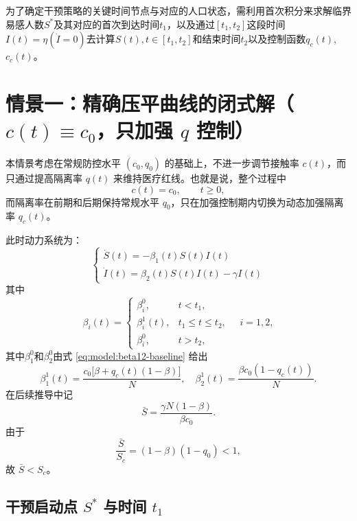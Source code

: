 \documentclass[lang=cn,a4paper,newtx]{elegantpaper}
\numberwithin{equation}{section}
\theoremstyle{plain}
\begin{document}
为了确定干预策略的关键时间节点与对应的人口状态，需利用首次积分来求解临界易感人数$S^*$及其对应的首次到达时间$t_1$，以及通过$[t_1,t_2]$这段时间$I(t) = \eta(\dot{I}=0)$去计算$S(t),t \in [t_1,t_2]$和结束时间$t_2$以及控制函数$q_c(t)$,$c_c(t)$。

\section{情景一：精确压平曲线的闭式解（$c(t)\equiv c_0$，只加强 $q$ 控制）}
\label{sec:s1}
本情景考虑在常规防控水平 $(c_0,q_0)$ 的基础上，不进一步调节接触率 $c(t)$，而只通过提高隔离率 $q(t)$ 来维持医疗红线。也就是说，整个过程中
\begin{equation*}
c(t)=c_0,\qquad t\ge 0,
\end{equation*}
而隔离率在前期和后期保持常规水平 $q_0$，只在加强控制期内切换为动态加强隔离率 $q_c(t)$。

此时动力系统为：
\begin{equation}
\begin{cases}
\dot{S}(t) = - \beta_1(t) S(t) I(t) \\
\dot{I}(t) = \beta_2(t) S(t) I(t) - \gamma I(t)
\end{cases}
\label{eq:s1:dynamics}
\end{equation}
其中
\begin{equation}
\beta_i(t)=
\begin{cases}
\beta_i^0, & t<t_1,\\
\beta_i^1(t), & t_1\le t\le t_2,\\
\beta_i^0, & t>t_2,
\end{cases}
\quad i=1,2,
\end{equation}
其中$\beta_1^0$和$\beta_2^0$由式 \eqref{eq:model:beta12-baseline} 给出
\begin{equation}
\beta_1^1(t)=\frac{c_0\big[\beta+q_c(t)(1-\beta)\big]}{N},
\quad
\beta_2^1(t)=\frac{\beta c_0(1-q_c(t))}{N}.
\label{eq:s1:beta12-control}
\end{equation}
在后续推导中记
\begin{equation}
\bar S
=
\frac{\gamma N(1-\beta)}{\beta c_0}.
\label{eq:s1:barS}
\end{equation}
由于
\[
\frac{\bar S}{S_c}
=
(1-\beta)(1-q_0)<1,
\]
故 $\bar S<S_c$。

\subsection{干预启动点 $S^*$ 与时间 $t_1$ }
\end{document}
